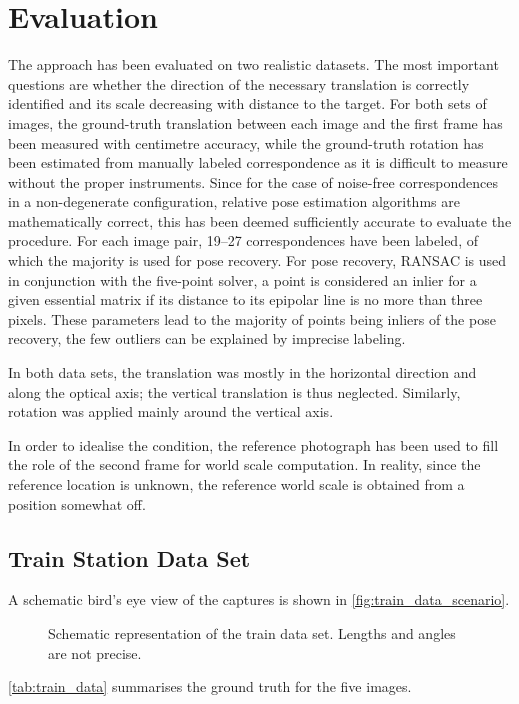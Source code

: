 \chapter{Evaluation}

The approach has been evaluated on two realistic datasets. The most important
questions are whether the direction of the necessary translation is correctly
identified and its scale decreasing with distance to the target.
For both sets of images, the ground-truth translation between each image and the
first frame has been measured with centimetre accuracy, while the ground-truth
rotation has been estimated from manually labeled correspondence as it is
difficult to measure without the proper instruments. Since for the case of
noise-free correspondences in a non-degenerate configuration, relative pose
estimation algorithms are mathematically correct, this has been deemed
sufficiently accurate to evaluate the procedure. For each image pair, 19--27
correspondences have been labeled, of which the majority is used for pose
recovery. For pose recovery, RANSAC is used in conjunction with the five-point
solver, a point is considered an inlier for a given essential matrix if its
distance to its epipolar line is no more than three pixels. These parameters
lead to the majority of points being inliers of the pose recovery, the few
outliers can be explained by imprecise labeling.

In both data sets, the translation was mostly in the horizontal direction and
along the optical axis; the vertical translation is thus neglected. Similarly,
rotation was applied mainly around the vertical axis.

In order to idealise the condition, the reference photograph has been used to
fill the role of the second frame for world scale computation. In reality, since
the reference location is unknown, the reference world scale is obtained from a
position somewhat off.

\section{Train Station Data Set}

A schematic bird's eye view of the captures is shown in \autoref{fig:train_data_scenario}.

\begin{figure}
   {\centering      
      
      \caption{Schematic representation of the train data set. Lengths and angles are not
      precise.}
   \label{fig:train_data_scenario}}
\end{figure}
\autoref{tab:train_data} summarises the ground truth for the five images.


